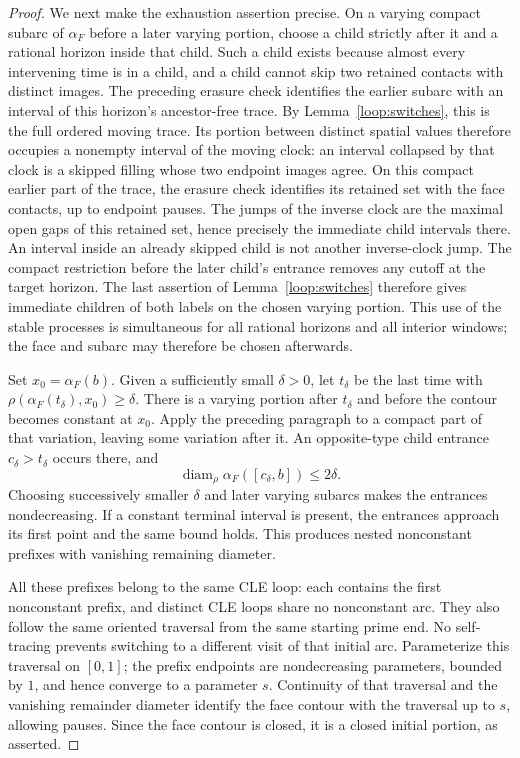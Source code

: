 \documentclass[11pt]{article}
\numberwithin{equation}{section}
\theoremstyle{definition}
\theoremstyle{remark}
\newcommand{\1}{\mathbf 1}
\DeclareMathOperator{\diam}{diam}
\begin{document}
\begin{proof}
We next make the exhaustion assertion precise.  On a varying compact
subarc of $\alpha_F$ before a later varying portion, choose a child
strictly after it and a rational horizon inside that child.  Such a
child exists because almost every intervening time is in a child,
and a child cannot skip two retained contacts with distinct images.
The preceding erasure check identifies the earlier subarc with an
interval of this horizon's ancestor-free trace.  By
Lemma~\ref{loop:switches}, this is the full ordered moving trace.
Its portion between distinct spatial values therefore occupies a
nonempty interval of the moving clock: an interval collapsed by that
clock is a skipped filling whose two endpoint images agree.
On this compact earlier part of the trace, the erasure check identifies
its retained set with the face contacts, up to endpoint pauses.  The
jumps of the inverse clock are the maximal open gaps of this retained
set, hence precisely the immediate child intervals there.  An interval
inside an already skipped child is not another inverse-clock jump.
The compact restriction before the later child's entrance removes any
cutoff at the target horizon.  The last assertion of
Lemma~\ref{loop:switches} therefore gives immediate children of both
labels on the chosen varying portion.  This use of the stable processes is simultaneous
for all rational horizons and all interior windows; the face and
subarc may therefore be chosen afterwards.

Set $x_0=\alpha_F(b)$.  Given a sufficiently small $\delta>0$, let
$t_\delta$ be the last time with
$\rho(\alpha_F(t_\delta),x_0)\ge\delta$.  There is a varying portion
after $t_\delta$ and before the contour becomes constant at $x_0$.
Apply the preceding paragraph to a compact part of that variation,
leaving some variation after it.  An opposite-type child entrance
$c_\delta>t_\delta$ occurs there, and
\[
 \diam_\rho\alpha_F([c_\delta,b])\le2\delta.
\]
Choosing successively smaller $\delta$ and later varying subarcs
makes the entrances nondecreasing.  If a constant terminal interval
is present, the entrances approach its first point and the same bound
holds.  This produces nested nonconstant prefixes with vanishing
remaining diameter.

All these prefixes belong to the same CLE loop: each contains the
first nonconstant prefix, and distinct CLE loops share no nonconstant
arc.  They also follow the same oriented traversal from the same
starting prime end.  No self-tracing prevents switching to a different
visit of that initial arc.  Parameterize this traversal on $[0,1]$;
the prefix endpoints are nondecreasing parameters, bounded by $1$,
and hence converge to a parameter $s$.  Continuity of that traversal
and the vanishing remainder diameter identify the face contour with
the traversal up to $s$, allowing pauses.  Since the face contour is
closed, it is a closed initial portion, as asserted.
\end{proof}
\end{document}
